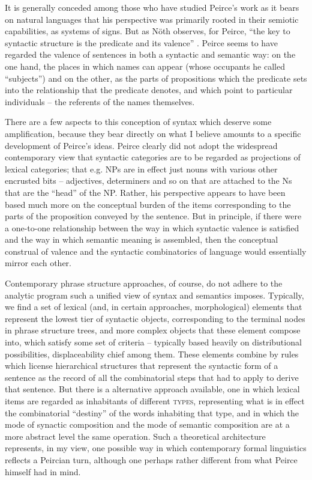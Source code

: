 \documentclass[output=paper,colorlinks,citecolor=brown]{langscibook}
\begin{document}
It is generally conceded among those who have studied Peirce's work as
it bears on natural languages that his perspective was primarily
rooted in their semiotic capabilities, as systems of signs. But as
Nöth observes, for Peirce, ``the key to syntactic structure is the
predicate and its valence'' \citeyearpar[7]{nothPeirce}. Peirce
seems to have regarded the valence of sentences in both a syntactic
and semantic way: on the one hand, the places in which names can
appear (whose occupants he called ``subjects'') and on the other, as the
parts of propositions which the predicate sets into the relationship
that the predicate denotes, and which point to particular
individuals -- the referents of the names themselves.

There are a few aspects to this conception of syntax which deserve
some amplification, because they bear directly on what I believe
amounts to a specific development of Peirce's ideas. Peirce clearly
did not adopt the widespread contemporary view that syntactic
categories are to be regarded as projections of lexical categories;
that e.g. NPs are in effect just nouns with various other encrusted
bits -- adjectives, determiners and so on that are attached to the Ns
that are the ``head'' of the NP. Rather, his perspective appears to have been
based much more on the conceptual burden of the items corresponding to
the parts of the proposition conveyed by the sentence. But in
principle, if there were a one-to-one relationship between the way in
which syntactic valence is satisfied and the way in which semantic
meaning is assembled, then the conceptual construal of valence and the
syntactic combinatorics of language would essentially mirror each
other.

Contemporary phrase structure approaches, of course, do not adhere to
the analytic program such a unified view of syntax and semantics
imposes. Typically, we find a set of lexical (and, in certain
approaches, morphological) elements that represent the lowest tier of
syntactic objects, corresponding to the terminal nodes in phrase
structure trees, and more complex objects that these element compose
into, which satisfy some set of criteria -- typically based heavily on
distributional possibilities, displaceability chief among them. These
elements combine by rules which license hierarchical structures that
represent the syntactic form of a sentence as the record of all the
combinatorial steps that had to apply to derive that sentence.  But
there is a alternative approach available, one in which lexical items
are regarded as inhabitants of different \textsc{types}, representing what
is in effect the combinatorial ``destiny'' of the words inhabiting that
type, and in which the mode of synactic composition and the mode of
semantic composition are at a more abstract level the same
operation. Such a theoretical architecture represents, in my view, one
possible way in which contemporary formal linguistics reflects a
Peircian turn, although one perhaps rather different from what Peirce
himself had in mind.
\end{document}

